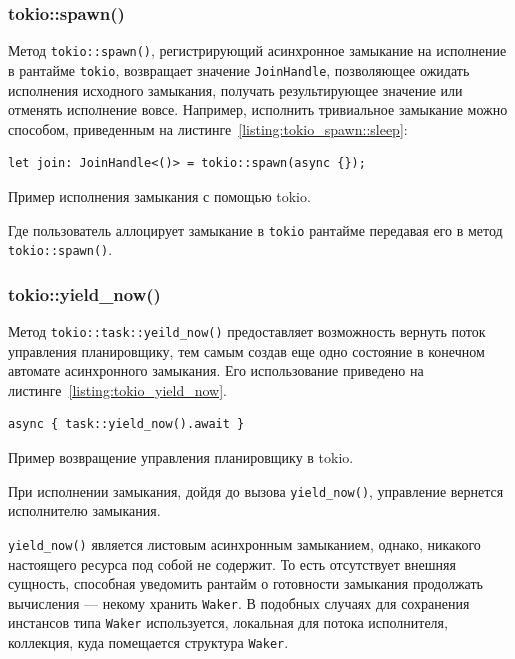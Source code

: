 \subsubsection{tokio::spawn()}

Метод \verb|tokio::spawn()|, регистрирующий асинхронное замыкание на исполнение в рантайме \verb|tokio|, возвращает значение \verb|JoinHandle|, позволяющее ожидать исполнения исходного замыкания, получать результирующее значение или отменять исполнение вовсе. Например, исполнить тривиальное замыкание можно способом, приведенным на листинге~\ref{listing:tokio_spawn::sleep}:

\begin{listing}[H]
    \begin{verbatim}
let join: JoinHandle<()> = tokio::spawn(async {});
    \end{verbatim}

    \caption{Пример исполнения замыкания с помощью tokio.}
    \label{listing:tokio_spawn::sleep}
\end{listing}

Где пользователь аллоцирует замыкание в \verb|tokio| рантайме передавая его в метод \verb|tokio::spawn()|.

\subsubsection{tokio::yield\_now()}

Метод \verb|tokio::task::yeild_now()| предоставляет возможность вернуть поток управления планировщику, тем самым создав еще одно состояние в конечном автомате асинхронного замыкания. Его использование приведено на листинге~\ref{listing:tokio_yield_now}.

\begin{listing}[H]
    \begin{verbatim}
async { task::yield_now().await }
    \end{verbatim}

    \caption{Пример возвращение управления планировщику в tokio.}
    \label{listing:tokio_yield_now}
\end{listing}

При исполнении замыкания, дойдя до вызова  \verb|yield_now()|, управление вернется исполнителю замыкания.

\verb|yield_now()| является листовым асинхронным замыканием, однако, никакого настоящего ресурса под собой не содержит. То есть отсутствует внешняя сущность, способная уведомить рантайм о готовности замыкания продолжать вычисления --- некому хранить \verb|Waker|. В подобных случаях для сохранения инстансов типа \verb|Waker| используется, локальная для потока исполнителя, коллекция, куда помещается структура \verb|Waker|.

